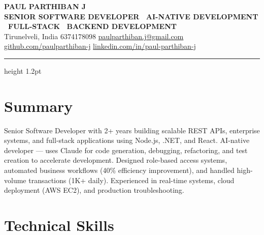 \documentclass[letterpaper,10pt]{article}
\begin{document}
\begin{center}
{\Large \textbf{PAUL PARTHIBAN J}} \\
\vspace{2pt}
{\color{accent}\textbf{SENIOR SOFTWARE DEVELOPER \textbullet\ AI-NATIVE DEVELOPMENT \textbullet\ FULL-STACK \textbullet\ BACKEND DEVELOPMENT}} \\

\vspace{4pt}
{\color{muted}Tirunelveli, India \textbar{} 6374178098 \textbar{} \href{mailto:paulparthiban.j@gmail.com}{paulparthiban.j@gmail.com} \textbar{} \href{https://github.com/paulparthiban-j}{github.com/paulparthiban-j} \textbar{} \href{https://www.linkedin.com/in/paul-parthiban-j}{linkedin.com/in/paul-parthiban-j}}
\end{center}
\vspace{-8pt}
{\color{accent}\hrule height 1.2pt}
\vspace{4pt}

\section{Summary}
\small{
Senior Software Developer with 2+ years building scalable REST APIs, enterprise systems, and full-stack applications using Node.js, .NET, and React. AI-native developer — uses Claude for code generation, debugging, refactoring, and test creation to accelerate development. Designed role-based access systems, automated business workflows (40\% efficiency improvement), and handled high-volume transactions (1K+ daily). Experienced in real-time systems, cloud deployment (AWS EC2), and production troubleshooting.
}

\section{Technical Skills}
\end{document}
